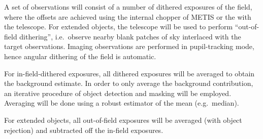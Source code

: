 A set of observations will consist of a number of dithered exposures
of the field, where the offsets are achieved using the internal
chopper of METIS or the with the telescope. For extended objects, the
telescope will be used to perform ``out-of-field dithering'', i.e.\
observe nearby blank patches of sky interlaced with the target
observations. Imaging observations are performed in pupil-tracking
mode, hence angular dithering of the field is automatic.

For in-field-dithered exposures, all dithered exposures will be
averaged to obtain the background estimate. In order to only average
the background contribution, an iterative procedure of object
detection and masking will be employed. Averaging will be done using a
robust estimator of the mean (e.g.\ median).

For extended objects, all out-of-field exposures will be averaged
(with object rejection) and subtracted off the in-field exposures.

%

